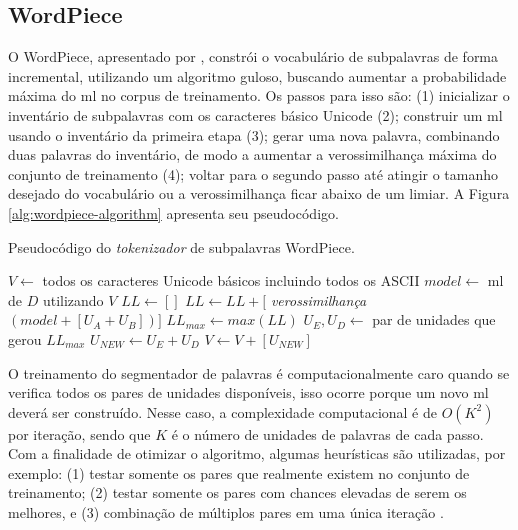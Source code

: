 \subsection{WordPiece}
\label{sec:tokenizer-wordpiece}

O WordPiece, apresentado por \textcite{Schuster2012Japanese}, constrói o vocabulário de subpalavras de forma incremental, utilizando um algoritmo guloso, buscando aumentar a probabilidade máxima do \gls{ml} no corpus de treinamento. Os passos para isso são: (1) inicializar o inventário de subpalavras com os caracteres básico Unicode (2); construir um \gls{ml} usando o inventário da primeira etapa (3); gerar uma nova palavra, combinando duas palavras do inventário, de modo a aumentar a verossimilhança máxima do conjunto de treinamento (4); voltar para o segundo passo até atingir o tamanho desejado do vocabulário ou a verossimilhança ficar abaixo de um limiar. A Figura \ref{alg:wordpiece-algorithm} apresenta seu pseudocódigo.

\begin{algorithm}
    \caption{Pseudocódigo do \textit{tokenizador} de subpalavras WordPiece.}
    $V \gets$ todos os caracteres Unicode básicos incluindo todos os ASCII\;
     {
        $model \gets$ \gls{ml} de $D$ utilizando $V$\;
        $LL \gets []$\;
         {
            $LL \gets LL + [$ \textit{verossimilhança}$(model + [U_A + U_B])]$\;
        }
        $LL_{max} \gets max(LL)$\;
        $U_E,U_D \gets$ par de unidades que gerou $LL_{max}$\;
        $U_{NEW} \gets U_E + U_D$\;
        $V \gets V + [U_{NEW}]$\;
    }
    \label{alg:wordpiece-algorithm}
\end{algorithm}

O treinamento do segmentador de palavras é computacionalmente caro quando se verifica todos os pares de unidades disponíveis, isso ocorre porque um novo \gls{ml} deverá ser construído. Nesse caso, a complexidade computacional é de $O(K^2)$ por iteração, sendo que $K$ é o número de unidades de palavras de cada passo. Com a finalidade de otimizar o algoritmo, algumas heurísticas são utilizadas, por exemplo: (1) testar somente os pares que realmente existem no conjunto de treinamento; (2) testar somente os pares com chances elevadas de serem os melhores, e (3) combinação de múltiplos pares em uma única iteração \cite{Schuster2012Japanese}.

